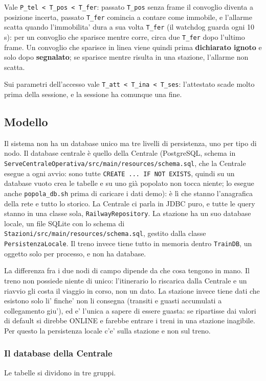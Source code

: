 \documentclass[11pt]{article}
\begin{document}
Vale \texttt{P\_tel < T\_pos < T\_fer}: passato \texttt{T\_pos} senza frame il convoglio diventa a posizione incerta,
passato \texttt{T\_fer} comincia a contare come immobile, e l'allarme scatta quando l'immobilita' dura a sua
volta \texttt{T\_fer} (il watchdog guarda ogni 10 s): per un convoglio che sparisce mentre corre, circa due
\texttt{T\_fer} dopo l'ultimo frame. Un convoglio che sparisce in linea viene quindi prima \textbf{dichiarato
ignoto} e solo dopo \textbf{segnalato}; se sparisce mentre risulta in una stazione, l'allarme non scatta.

Sui parametri dell'accesso vale \texttt{T\_att < T\_ina < T\_ses}: l'attestato scade molto prima della
sessione, e la sessione ha comunque una fine.
\subsection{Modello}
\label{sec:orgaaeacb0}
Il sistema non ha un database unico ma tre livelli di persistenza, uno per tipo di nodo.
Il database centrale è quello della Centrale (PostgreSQL, schema in
\texttt{ServeCentraleOperativa/src/main/resources/schema.sql}, che la Centrale esegue a ogni avvio: sono
tutte \texttt{CREATE ... IF NOT EXISTS}, quindi su un database vuoto crea le tabelle e su uno già popolato
non tocca niente; lo esegue anche \texttt{popola\_db.sh} prima di caricare i dati demo): è lì che stanno
l'anagrafica della rete e tutto lo storico. La Centrale ci parla
in JDBC puro, e tutte le query stanno in una classe sola, \texttt{RailwayRepository}. La stazione ha un suo database locale, un file SQLite con lo schema
di \texttt{Stazioni/src/main/resources/schema.sql}, gestito dalla classe \texttt{PersistenzaLocale}. Il
treno invece tiene tutto in memoria dentro \texttt{TrainDB}, un oggetto solo per processo, e non ha
database.

La differenza fra i due nodi di campo dipende da che cosa tengono in mano. Il treno non possiede
niente di unico: l'itinerario lo riscarica dalla Centrale e un riavvio gli costa il viaggio in
corso, non un dato. La stazione invece tiene dati che esistono solo li' finche' non li consegna
(transiti e guasti accumulati a collegamento giu'), ed e' l'unica a sapere di essere guasta: se
ripartisse dai valori di default si direbbe ONLINE e farebbe entrare i treni in una stazione
inagibile. Per questo la persistenza locale c'e' sulla stazione e non sul treno.
\subsubsection{Il database della Centrale}
\label{sec:orgb05c6d2}
Le tabelle si dividono in tre gruppi.
\end{document}
